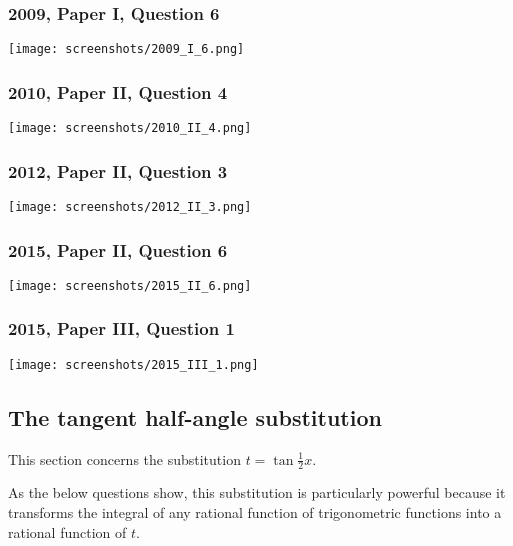 \documentclass[a4paper,12pt]{article}
\begin{document}
\subsubsection{2009, Paper I, Question 6}
\begin{center}
 \texttt{[image: screenshots/2009\_I\_6.png]}
\end{center}

\subsubsection{2010, Paper II, Question 4}
\begin{center}
 \texttt{[image: screenshots/2010\_II\_4.png]}
\end{center}

\subsubsection{2012, Paper II, Question 3}
\begin{center}
 \texttt{[image: screenshots/2012\_II\_3.png]}
\end{center}

\subsubsection{2015, Paper II, Question 6}
\begin{center}
 \texttt{[image: screenshots/2015\_II\_6.png]}
\end{center}

\subsubsection{2015, Paper III, Question 1}
\begin{center}
 \texttt{[image: screenshots/2015\_III\_1.png]}
\end{center}

\subsection{The tangent half-angle substitution}

This section concerns the substitution \(t = \tan \tfrac 12 x\).

As the below questions show, this substitution is particularly powerful because
it transforms the integral of any rational function of trigonometric functions
into a rational function of \(t\).
\end{document}
